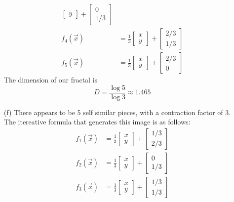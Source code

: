 \documentclass[12pt]{article}
\begin{document}
\begin{itemize}
\begin{align*}
\begin{bmatrix}
			y
		\end{bmatrix} + \begin{bmatrix}
			0 \\
			1/3
		\end{bmatrix} \\
		f_4(\vec{x}) &= \frac{1}{3} \begin{bmatrix}
			x \\
			y
		\end{bmatrix} + \begin{bmatrix}
			2/3 \\
			1/3
		\end{bmatrix} \\
		f_5(\vec{x}) &= \frac{1}{3} \begin{bmatrix}
			x \\
			y
		\end{bmatrix} + \begin{bmatrix}
			2/3 \\
			0
		\end{bmatrix}
	\end{align*}
	The dimension of our fractal is
	\[
		D = \frac{\log 5}{\log 3} \approx 1.465
	\]
	\item[(f)] There appears to be 5 self similar pieces, with a contraction factor of 3. The itereative formula that generates this image is as follows:
	\begin{align*}
		f_1(\vec{x}) &= \frac{1}{3} \begin{bmatrix}
			x \\
			y
		\end{bmatrix} + \begin{bmatrix}
			1/3 \\
			2/3
		\end{bmatrix} \\
		f_2(\vec{x}) &= \frac{1}{3} \begin{bmatrix}
			x \\
			y
		\end{bmatrix} + \begin{bmatrix}
			0 \\
			1/3
		\end{bmatrix} \\
		f_3(\vec{x}) &= \frac{1}{3} \begin{bmatrix}
			x \\
			y
		\end{bmatrix} + \begin{bmatrix}
			1/3 \\
			1/3
		\end{bmatrix} \\

\end{align*}
\end{itemize}
\end{document}
